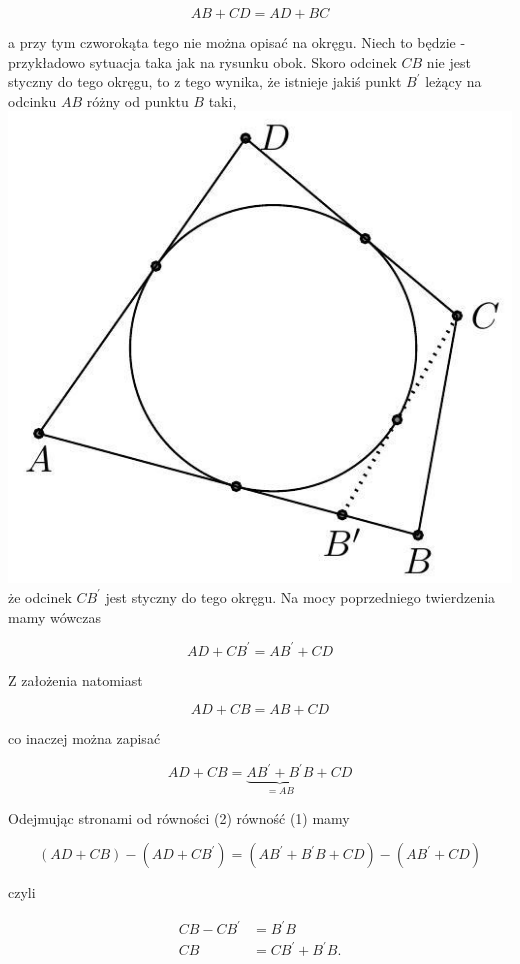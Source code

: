 \documentclass[10pt]{article}
\begin{document}
\[
A B+C D=A D+B C
\]

a przy tym czworokąta tego nie można opisać na okręgu. Niech to będzie - przykładowo sytuacja taka jak na rysunku obok. Skoro odcinek \(C B\) nie jest styczny do tego okręgu, to z tego wynika, że istnieje jakiś punkt \(B^{\prime}\) leżący na odcinku \(A B\) różny od punktu \(B\) taki,\\
\includegraphics[max width=\textwidth, center]{2024_11_21_e9b4faa005d5be2cc318g-049}\\
że odcinek \(C B^{\prime}\) jest styczny do tego okręgu. Na mocy poprzedniego twierdzenia mamy wówczas

\[
A D+C B^{\prime}=A B^{\prime}+C D
\]

Z założenia natomiast

\[
A D+C B=A B+C D
\]

co inaczej można zapisać

\[
A D+C B=\underbrace{A B^{\prime}+B^{\prime} B}_{=A B}+C D
\]

Odejmując stronami od równości (2) równość (1) mamy

\[
(A D+C B)-\left(A D+C B^{\prime}\right)=\left(A B^{\prime}+B^{\prime} B+C D\right)-\left(A B^{\prime}+C D\right)
\]

czyli

\[
\begin{aligned}
C B-C B^{\prime} & =B^{\prime} B \\
C B & =C B^{\prime}+B^{\prime} B .
\end{aligned}
\]
\end{document}
